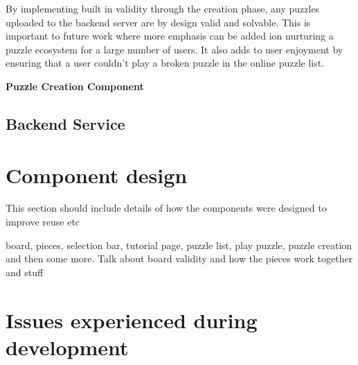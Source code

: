 \documentclass{l4proj}
\begin{document}
By implementing built in validity through the creation phase, any puzzles uploaded to the backend server are by design valid and solvable. This is important to future work where more emphasis can be added ion nurturing a puzzle ecosystem for a large number of users. It also adds to user enjoyment by ensuring that a user couldn't play a broken puzzle in the online puzzle list.

\textbf{Puzzle Creation Component}

\subsection{Backend Service}
\section{Component design}
This section should include details of how the components were designed to improve reuse etc 

   




board, pieces, selection bar, tutorial page, puzzle list, play puzzle, puzzle creation and then some more. Talk about board validity and how the pieces work together and stuff


\section{Issues experienced during development}
\end{document}

